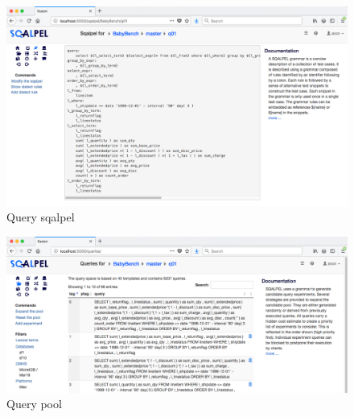 \documentclass{cidr-2019}
\begin{document}

\begin{figure}[t!]
  \centering
  \includegraphics[width=\textwidth]{Figures/scalpel2.png}
  \caption{Query {\sc sqalpel}
    \label{fig:sqalpel}}
\end{figure}




\begin{figure}[t!]
\centering
\includegraphics[width=\textwidth]{Figures/querypool2.png}
\caption{Query pool
	\label{fig:querypool2}}
\end{figure}
\end{document}

